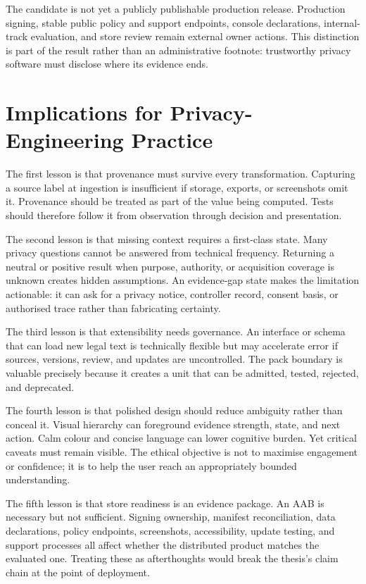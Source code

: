 The candidate is not yet a publicly publishable production release. Production signing, stable public policy and support endpoints, console declarations, internal-track evaluation, and store review remain external owner actions. This distinction is part of the result rather than an administrative footnote: trustworthy privacy software must disclose where its evidence ends.

\section{Implications for Privacy-Engineering Practice}

The first lesson is that provenance must survive every transformation. Capturing a source label at ingestion is insufficient if storage, exports, or screenshots omit it. Provenance should be treated as part of the value being computed. Tests should therefore follow it from observation through decision and presentation.

The second lesson is that missing context requires a first-class state. Many privacy questions cannot be answered from technical frequency. Returning a neutral or positive result when purpose, authority, or acquisition coverage is unknown creates hidden assumptions. An evidence-gap state makes the limitation actionable: it can ask for a privacy notice, controller record, consent basis, or authorised trace rather than fabricating certainty.

The third lesson is that extensibility needs governance. An interface or schema that can load new legal text is technically flexible but may accelerate error if sources, versions, review, and updates are uncontrolled. The pack boundary is valuable precisely because it creates a unit that can be admitted, tested, rejected, and deprecated.

The fourth lesson is that polished design should reduce ambiguity rather than conceal it. Visual hierarchy can foreground evidence strength, state, and next action. Calm colour and concise language can lower cognitive burden. Yet critical caveats must remain visible. The ethical objective is not to maximise engagement or confidence; it is to help the user reach an appropriately bounded understanding.

The fifth lesson is that store readiness is an evidence package. An AAB is necessary but not sufficient. Signing ownership, manifest reconciliation, data declarations, policy endpoints, screenshots, accessibility, update testing, and support processes all affect whether the distributed product matches the evaluated one. Treating these as afterthoughts would break the thesis's claim chain at the point of deployment.

